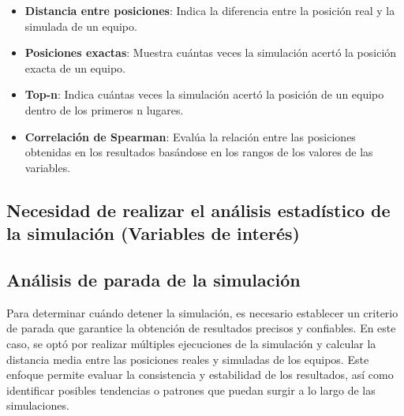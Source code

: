 \documentclass{article}
\begin{document}
            \begin{itemize}
                \item \textbf{Distancia entre posiciones}: Indica la diferencia entre la posición real y la simulada de un equipo.
                \item \textbf{Posiciones exactas}: Muestra cuántas veces la simulación acertó la posición exacta de un equipo.
                \item \textbf{Top-n}: Indica cuántas veces la simulación acertó la posición de un equipo dentro de los primeros n lugares.
                \item \textbf{Correlación de Spearman}: Evalúa la relación entre las posiciones obtenidas en los resultados basándose en los rangos de los valores de las variables.                
            \end{itemize}

            
        \subsection{Necesidad de realizar el análisis estadístico de la simulación (Variables de interés)}

        \subsection{Análisis de parada de la simulación}
            Para determinar cuándo detener la simulación, es necesario establecer un criterio de parada que garantice la obtención de resultados precisos y confiables. En este caso, se optó por realizar múltiples ejecuciones de la simulación y calcular la distancia media entre las posiciones reales y simuladas de los equipos. Este enfoque permite evaluar la consistencia y estabilidad de los resultados, así como identificar posibles tendencias o patrones que puedan surgir a lo largo de las simulaciones.
\end{document}
